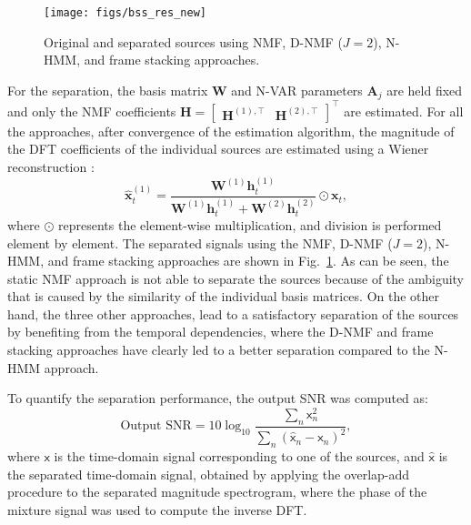 \documentclass[10pt,twocolumn,twoside] {IEEEtran}
\begin{document}
\begin{figure}
\texttt{[image: figs/bss\_res\_new]}\caption{\label{fig:bss} Original and separated sources using NMF, D-NMF ($J=2$), N-HMM, and frame stacking approaches.}
\end{figure}


For the separation, the basis matrix $\mathbf{W}$ and N-VAR parameters
$\mathbf{A}_{j}$ are held fixed and only the NMF coefficients
$\mathbf{H}={[\begin{array}{cc}
\mathbf{H}^{(1),\top} & \mathbf{H}^{(2),\top}\end{array}]}^\top$ are estimated. For all the approaches, after convergence of the estimation algorithm, the magnitude of the DFT coefficients of the individual
sources are estimated using a Wiener reconstruction \cite{Mohammadiha2013b}:
\begin{equation}
\mathbf{\hat{x}}_{t}^{\left(1\right)}=\frac{\mathbf{W}^{\left(1\right)}\mathbf{h}_{t}^{\left(1\right)}}{\mathbf{W}^{\left(1\right)}\mathbf{h}_{t}^{\left(1\right)}+\mathbf{W}^{\left(2\right)}\mathbf{h}_{t}^{\left(2\right)}}\odot\mathbf{x}_{t},
\label{eq:wiener_reconstruction}
\end{equation}
where $\odot$ represents the element-wise multiplication, and division is
performed element by element. The separated signals using the NMF,
D-NMF ($J=2$), N-HMM, and frame stacking approaches are shown in Fig.~\ref{fig:bss}. As can be seen, the static NMF approach is not able to separate the sources because of the ambiguity that is caused by the similarity of the individual
basis matrices. On the other hand, the three other approaches, lead to a satisfactory
separation of the sources by benefiting from the temporal dependencies, where the D-NMF and frame stacking approaches have clearly led to a better separation compared to the N-HMM approach.

To quantify the separation performance, the output SNR was computed as:
\begin{equation}
\text{Output SNR}=10\log_{10}\frac{\sum_{n}\mathsf{x}_{n}^{2}}{\sum_{n}\left(\hat{\mathsf{x}}_{n}-\mathsf{x}_{n}\right)^{2}},\label{eq:output_SNR}
\end{equation}
where $\mathsf{x}$ is the time-domain signal corresponding to one
of the sources, and $\hat{\mathsf{x}}$ is the separated time-domain signal, obtained by applying the overlap-add procedure
to the separated magnitude spectrogram, where the phase of the mixture signal was used to compute the inverse DFT.
\end{document}
